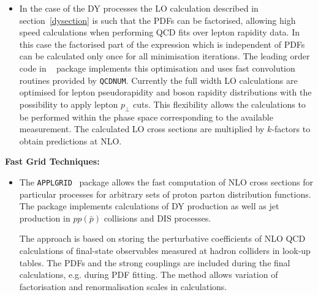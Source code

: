 \begin{description}
\begin{itemize}
\item 
In the case of the DY processes the LO calculation described in section~\ref{dysection}
is such that the PDFs can be factorised, allowing high speed calculations when 
performing QCD fits over lepton rapidity data. In this case
the factorised part of the expression which is independent of PDFs can be
calculated only once for all minimisation iterations.
The leading order code in \fitter~ package implements this 
optimisation and uses fast convolution routines provided by
\texttt{QCDNUM}. Currently the full width LO calculations are optimised 
for lepton pseudorapidity and boson rapidity distributions with the
possibility to apply lepton \(p_{\perp}\) cuts.
This flexibility allows the calculations to be performed within the phase space
corresponding to the available measurement.
The calculated LO cross sections are multiplied by
$k$-factors to obtain predictions at NLO.

\end{itemize}


\vspace*{0.25cm}
\item \bf {Fast Grid Techniques:} \rm


\begin{itemize}
    \item The \texttt{APPLGRID}~\cite{Carli:2010rw} package allows the fast computation 
of NLO cross sections for particular processes for arbitrary sets of 
proton parton distribution functions. The package implements
calculations of DY production as well as jet production in $pp(\bar p)$
collisions and DIS processes. 

The approach is based on storing the perturbative coefficients
of NLO QCD calculations of final-state observables measured
at hadron colliders in look-up tables. The PDFs and the 
strong couplings are included during the final calculations,
e.g. during PDF fitting. The method allows 
variation of factorisation and renormalisation scales in
calculations.


\end{itemize}
\end{description}
